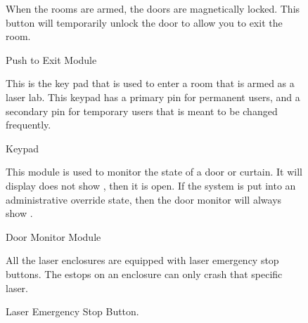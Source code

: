 \documentclass[letterpaper,10pt,english]{sphinxmanual}
\begin{document}
\begin{figure}[htbp]
\centering
\capstart

\noindent{}
\caption{ Push to Exit Module}\label{\detokenize{user_documentation/Vault-1_laser:id7}}
\begin{sphinxlegend}
\sphinxAtStartPar
When the rooms are armed, the doors are magnetically locked.
This button will temporarily unlock the door to allow you to exit the room.
\end{sphinxlegend}
\end{figure}

\begin{figure}[htbp]
\centering
\capstart

\noindent{}
\caption{ Keypad}\label{\detokenize{user_documentation/Vault-1_laser:id8}}
\begin{sphinxlegend}
\sphinxAtStartPar
This is the key pad that is used to enter a room that is armed as a laser lab.
This keypad has a primary pin for permanent users, and a secondary pin for temporary users that is meant to be changed frequently.
\end{sphinxlegend}
\end{figure}

\begin{figure}[htbp]
\centering
\capstart

\noindent{}
\caption{ Door Monitor Module}\label{\detokenize{user_documentation/Vault-1_laser:id9}}
\begin{sphinxlegend}
\sphinxAtStartPar
This module is used to monitor the state of a door or curtain.
It will display does not show , then it is open.
If the system is put into an administrative override state, then the door monitor will always show .
\end{sphinxlegend}
\end{figure}

\begin{figure}[htbp]
\centering
\capstart

\noindent{}
\caption{ Laser Emergency Stop Button.}\label{\detokenize{user_documentation/Vault-1_laser:id10}}
\begin{sphinxlegend}
\sphinxAtStartPar
All the laser enclosures are equipped with laser emergency stop buttons.
The e\sphinxhyphen{}stops on an enclosure can only crash that specific laser.
\end{sphinxlegend}
\end{figure}
\end{document}
